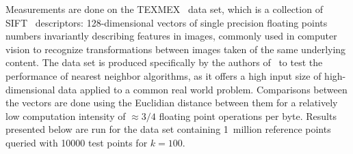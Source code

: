   Measurements are done on the TEXMEX~\cite{jegou2011} data set, which is 
  a collection of SIFT~\cite{lowe1999a,lowe2004a} descriptors: 128-dimensional 
  vectors of single precision floating points numbers invariantly describing features in images, commonly used in computer 
  vision to recognize transformations between images taken of the same 
  underlying content. The data set is produced specifically by the authors 
  of~\cite{jegou2011} to test the performance of nearest neighbor algorithms, 
  as it offers a high input size of
  high-dimensional data applied to a common real world problem.
  Comparisons between the vectors are done using the Euclidian distance between them for a relatively low computation intensity of $\approx3/4$ floating point operations per byte. Results presented below are run for the data set containing 1~million reference points queried with 10000 test points for $k=100$.  


